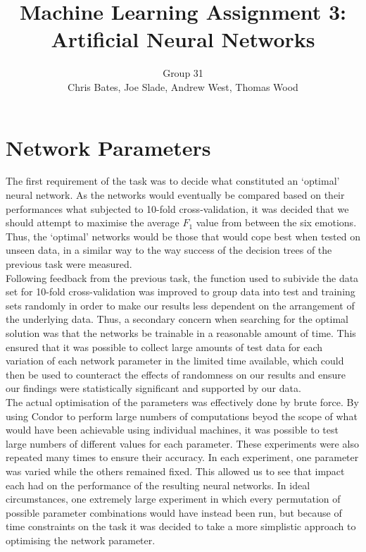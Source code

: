 \documentclass[a4paper]{article}
\title{Machine Learning Assignment 3: Artificial Neural Networks}
\author{Group 31 \\ Chris Bates, Joe Slade, Andrew West, Thomas Wood}
\begin{document}
\maketitle
\section{Network Parameters}


The first requirement of the task was to decide what constituted an `optimal' neural network. As the networks would eventually
be compared based on their performances what subjected to 10-fold cross-validation, it was decided that we should attempt to 
maximise the average $F_1$ value from between the six emotions. Thus, the `optimal' networks would be those that would cope
best when tested on unseen data, in a similar way to the way success of the decision trees of the previous task were measured.\\

Following feedback from the previous task, the function used to subivide the data set for 10-fold cross-validation was improved
to group data into test and training sets randomly in order to make our results less dependent on the arrangement of the underlying data.
Thus, a secondary concern when searching for the optimal solution was that the networks be trainable in a reasonable amount of time.
This ensured that it was possible to collect large amounts of test data for each variation of each network parameter in the
limited time available, which could then be used to counteract the effects of randomness on our results and ensure our findings
were statistically significant and supported by our data.\\

The actual optimisation of the parameters was effectively done by brute force. By using Condor to perform large numbers of computations
beyod the scope of what would have been achievable using individual machines, it was possible to test large numbers of different values
for each parameter. These experiments were also repeated many times to ensure their accuracy. In each experiment, one parameter was varied
while the others remained fixed. This allowed us to see that impact each had on the performance of the resulting neural networks. In ideal
circumstances, one extremely large experiment in which every permutation of possible parameter combinations would have instead been run,
but because of time constraints on the task it was decided to take a more simplistic approach to optimising the network parameter.\\
\end{document}
